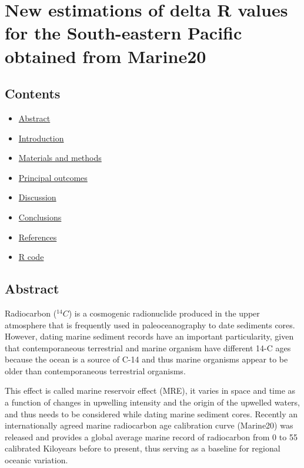 \documentclass[
]{article}
\author{}
\date{\vspace{-2.5em}}
\providecommand{\tightlist}{%
  \setlength{\itemsep}{0pt}\setlength{\parskip}{0pt}}
\begin{document}
\hypertarget{new-estimations-of-delta-r-values-for-the-south-eastern-pacific-obtained-from-marine20}{%
\section{New estimations of delta R values for the South-eastern Pacific
obtained from
Marine20}\label{new-estimations-of-delta-r-values-for-the-south-eastern-pacific-obtained-from-marine20}}

\hypertarget{contents}{%
\subsection{Contents}\label{contents}}

\begin{itemize}
\tightlist
\item
  \protect\hyperlink{abstract}{Abstract}
\item
  \protect\hyperlink{introduction}{Introduction}
\item
  \protect\hyperlink{materials-and-methods}{Materials and methods}
\item
  \protect\hyperlink{principal-outcomes}{Principal outcomes}
\item
  \protect\hyperlink{ux5cux23discussion}{Discussion}
\item
  \protect\hyperlink{conclusions}{Conclusions}
\item
  \protect\hyperlink{references}{References}
\item
  \protect\hyperlink{r-code}{R code}
\end{itemize}

\hypertarget{abstract}{%
\subsection{Abstract}\label{abstract}}

Radiocarbon (\(^{14}C\)) is a cosmogenic radionuclide produced in the
upper atmosphere that is frequently used in paleoceanography to date
sediments cores. However, dating marine sediment records have an
important particularity, given that contemporaneous terrestrial and
marine organism have different 14-C ages because the ocean is a source
of C-14 and thus marine organisms appear to be older than
contemporaneous terrestrial organisms.

This effect is called marine reservoir effect (MRE), it varies in space
and time as a function of changes in upwelling intensity and the origin
of the upwelled waters, and thus needs to be considered while dating
marine sediment cores. Recently an internationally agreed marine
radiocarbon age calibration curve (Marine20) was released and provides a
global average marine record of radiocarbon from 0 to 55 calibrated
Kiloyears before to present, thus serving as a baseline for regional
oceanic variation.
\end{document}
